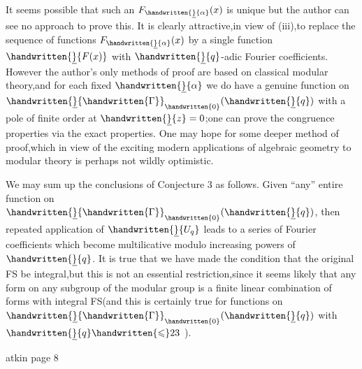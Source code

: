 It seems possible that such an $F_{\handwritten{\underline}{\alpha}}(x)$ is unique but the author can see no approach to prove this. It is clearly attractive,in view of (iii),to replace the sequence of functions $F_{\handwritten{\underline}{\alpha}}(x)$ by a single function $\handwritten{\underline}{F(x)}$ with $\handwritten{\underline}{q}$-adic Fourier coefficients. However the author's only methods of proof are based on classical modular theory,and for each fixed $\handwritten{\underline}{\alpha}$ we do have a genuine function on $\handwritten{\underline}{\handwritten{\Gamma}}_{\handwritten{0}}(\handwritten{\underline}{q})$ with a pole of finite order at $\handwritten{\underline}{z}=0$;one can prove the congruence properties via the exact properties. One may hope for some deeper method of proof,which in view of the exciting modern applications of algebraic geometry to modular theory is perhaps not wildly optimistic.

We may sum up the conclusions of Conjecture 3 as follows. Given ``any'' entire function on $\handwritten{\underline}{\handwritten{\Gamma}}_{\handwritten{0}}(\handwritten{\underline}{q})$, then repeated application of $\handwritten{\underline}{U_q}$ leads to a series of Fourier coefficients which become multilicative modulo increasing powers of $\handwritten{\underline}{q}$. It is true that we have made the condition that the original FS be integral,but this is not an essential restriction,since it seems likely that any form on any  subgroup of the modular group is a finite linear combination of forms with integral FS(and this is certainly true for functions on $\handwritten{\underline}{\handwritten{\Gamma}}_{\handwritten{0}}(\handwritten{\underline}{q})$ with $\handwritten{\underline}{q}\handwritten{\leqslant}23$ ).
\par\noindent\hspace*{.25\linewidth}
\begin{flushright}atkin page 8\end{flushright}

